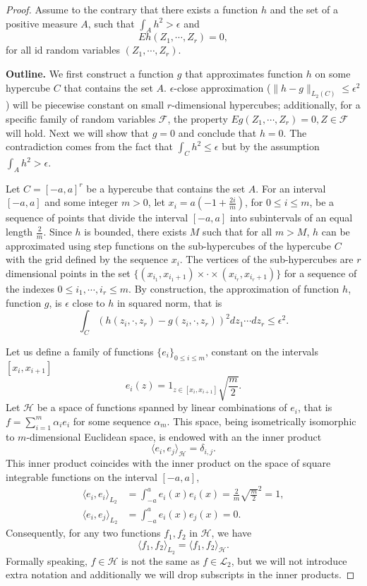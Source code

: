 \documentclass{article}
\begin{document}
\begin{proof}
Assume to the contrary that there exists a function $h$ and the set of a positive measure $A$, such that $\int_{A} h^2 > \epsilon$ and   
$$
E h(Z_1,\cdots,Z_r) = 0,
$$
for all id random variables $(Z_1,\cdots,Z_r)$.

\textbf{Outline.} We first construct a function $g$ that  approximates function $h$ on some hypercube $C$ that contains the set $A$.  $\epsilon$-close approximation ($\| h-g\|_{L_2(C)} \leq \epsilon^2$) will be piecewise constant on small  $r$-dimensional hypercubes; additionally, for a specific family of random variables $\mathcal{F}$, the property $E g(Z_1,\cdots,Z_r)=0, Z \in \mathcal{F}$ will hold. Next we will show that $g=0$ and conclude that $h=0$. The contradiction comes from the fact that $\int_{C} h^2 \leq \epsilon$ but by the assumption $\int_{A} h^2 > \epsilon$.  

Let $C=[-a,a]^r$ be a hypercube that contains the set $A$. For an interval $[-a,a]$ and some integer $m>0$, let $x_i = a(-1 + \frac{2i}{m})$, for $0 \leq i \leq m$, be a sequence of points that divide the interval $[-a,a]$ into subintervals of an equal length $\frac{2}{m}$. Since $h$ is bounded, there exists $M$ such that for all $m>M$, $h$ can be approximated using step functions on the sub-hypercubes of the hypercube $C$ with the grid defined by the sequence $x_i$. The vertices of the sub-hypercubes are $r$ dimensional points in the set  $\{ (x_{i_1},x_{i_1+1}) \times \cdot \times (x_{i_r},x_{i_r+1})\}$ for a sequence of the indexes $0 \leq i_1, \cdots, i_r\leq m$. By construction, the approximation of function  $h$,  function $g$, is $\epsilon$ close to $h$ in squared norm, that is
 \[
  \int_{C} \left( h(z_i,\cdot,z_r) -g(z_i,\cdot,z_r) \right)^2 d z_1 \cdots d z_r \leq \epsilon^2.
 \]
 
 
Let us define a family of functions $\{e_i\}_{0\leq i \leq m}$, constant on the intervals $[x_i,x_{i+1}]$
\[
e_i(z) = 1_{z \in [x_i,x_{i+1}]} \sqrt{\frac{m}{2}}.
\]
Let $\mathcal H$ be a space of functions spanned by linear combinations of $e_i$, that is  $f = \sum_{i=1}^{m} \alpha_i e_i$ for some sequence $\alpha_m$. This space, being isometrically isomorphic to $m$-dimensional Euclidean space,  is endowed with an the inner product 
\[
\langle e_i,e_j \rangle_{\mathcal H} = \delta_{i,j}.
\]
This inner product coincides with the inner product on the space of square integrable functions on the interval $[-a,a]$, 
\begin{align}
\langle e_i,e_i \rangle_{L_2} &= \int_{-a}^{a} e_i(x) e_i(x) = \frac{2}{m} \sqrt{\frac m 2}^2 =1,  \\ 
\langle e_i,e_j \rangle_{L_2} &= \int_{-a}^{a} e_i(x) e_j(x) = 0. 
\end{align}
Consequently, for any two functions $f_1,f_2$ in $\mathcal{H}$, we have 
\[
\langle f_1,f_2 \rangle_{L_2} =  \langle f_1,f_2 \rangle_{\mathcal{H}}.
\]
Formally speaking, $f \in \mathcal{H}$ is not the same as $f \in \mathcal L_2$, but we will not  introduce extra notation and additionally  we will drop subscripts in the inner products. 


\end{proof}
\end{document}
